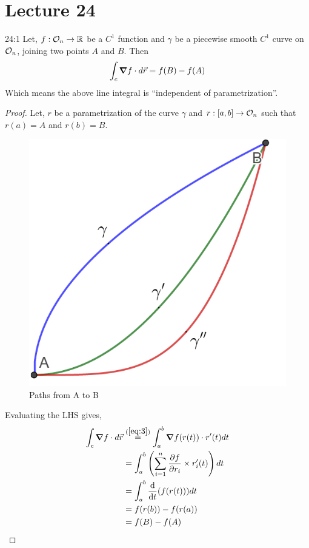 \documentclass[../Analysis-3.tex]{subfiles}
\begin{document}
\chapter*{Lecture 24} %
\setcounter{chapter}{24} %
\setcounter{section}{0}

\begin{Thm}{}{24:1}
  Let, $f: \mathcal{O}_{n} \to \mathbb{R}$ be a $C^1$ function and $\gamma$ be a piecewise smooth $C^1$ curve on $\mathcal{O}_{n}$, joining two points $A$ and $B$. Then
  \[\int_c \grad f\cdot d\vec{r} = f(B)-f(A)\]
  Which means the above line integral is ``independent of parametrization''.
\end{Thm}

\begin{proof}
  Let, $r$ be a parametrization of the curve $\gamma$ and $r :[a,b] \to \mathcal{O}_{n}$ such that $r(a)=A$ and $r(b)=B$.

  \begin{figure}
    \centering
    \includegraphics[width=.78\linewidth]{../figures/lec-24.1.png}
    \caption{Paths from A to B}
  \end{figure}

  Evaluating the LHS gives,
  \begin{align*}
    \int_c \grad f\cdot d\vec{r}
     & \overset{(\ref{eq:3})}{=} \int_a^b \grad f(r(t)) \cdot r'(t) dt       \\
     & = \int_a^b \left(\sum_{i=1}^{n} \pdv{f}{r_i}\times r_i'(t) \right) dt \\
     & =\int_a^b \dv{t}(f(r(t))) dt                                          \\
     & = f(r(b)) - f(r(a))                                                   \\
     & = f(B) - f(A)
  \end{align*}
\end{proof}
\end{document}
